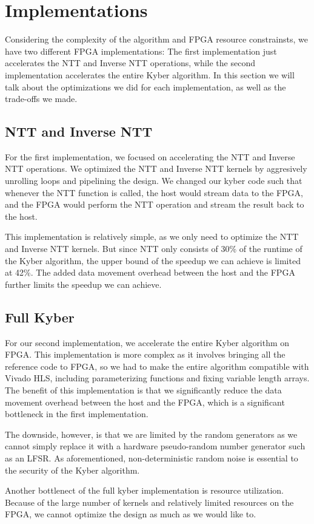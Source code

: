
\section*{Implementations}

Considering the complexity of the algorithm and FPGA resource constrainsts,
we have two different FPGA implementations: The first implementation just accelerates the NTT and Inverse
NTT operations, while the second implementation accelerates the entire Kyber algorithm.
In this section we will talk about the optimizations we did for each implementation, as well as the trade-offs we made.

\subsection*{NTT and Inverse NTT}
For the first implementation, we focused on accelerating the NTT and Inverse NTT operations.
We optimized the NTT and Inverse NTT kernels by aggresively unrolling loops and pipelining the design.
We changed our kyber code such that whenever the NTT function is called, the host would stream data to the FPGA,
and the FPGA would perform the NTT operation and stream the result back to the host.

This implementation is relatively simple, as we only need to optimize the NTT and Inverse NTT kernels. But since NTT
only consists of 30\% of the runtime of the Kyber algorithm, the upper bound of the speedup we can achieve is limited
at 42\%. The added data movement overhead between the host and the FPGA further limits the speedup we can achieve.

\subsection*{Full Kyber}
For our second implementation, we accelerate the entire Kyber algorithm on FPGA.
This implementation is more complex as it involves bringing all the reference code to FPGA,
so we had to make the entire algorithm compatible with Vivado HLS, including parameterizing
functions and fixing variable length arrays. The benefit of this implementation is that we significantly reduce the data
movement overhead between the host and the FPGA, which is a significant bottleneck in the first implementation.

The downside, however, is that we are limited by the random generators as we cannot simply replace it with a hardware
pseudo-random number generator such as an LFSR. As aforementioned, non-deterministic random noise is essential to the
security of the Kyber algorithm.

Another bottlenect of the full kyber implementation is resource utilization. Because of the large number of kernels
and relatively limited resources on the FPGA,
we cannot optimize the design as much as we would like to.